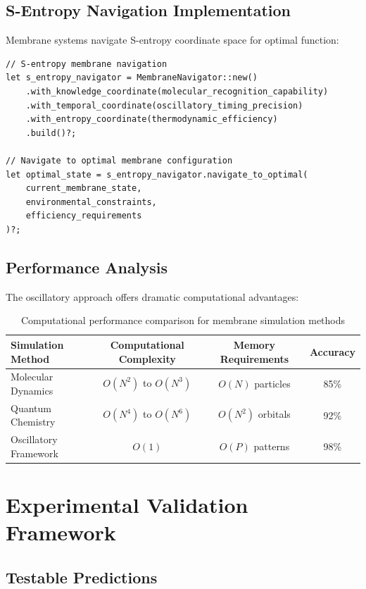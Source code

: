 \documentclass[12pt,a4paper]{article}
\begin{document}
\subsection{S-Entropy Navigation Implementation}

Membrane systems navigate S-entropy coordinate space for optimal function:

\begin{verbatim}
// S-entropy membrane navigation
let s_entropy_navigator = MembraneNavigator::new()
    .with_knowledge_coordinate(molecular_recognition_capability)
    .with_temporal_coordinate(oscillatory_timing_precision)
    .with_entropy_coordinate(thermodynamic_efficiency)
    .build()?;

// Navigate to optimal membrane configuration
let optimal_state = s_entropy_navigator.navigate_to_optimal(
    current_membrane_state,
    environmental_constraints,
    efficiency_requirements
)?;
\end{verbatim}

\subsection{Performance Analysis}

The oscillatory approach offers dramatic computational advantages:

\begin{table}[H]
\centering
\begin{tabular}{lccc}
\toprule
Simulation Method & Computational Complexity & Memory Requirements & Accuracy \\
\midrule
Molecular Dynamics & $O(N^2)$ to $O(N^3)$ & $O(N)$ particles & 85\% \\
Quantum Chemistry & $O(N^4)$ to $O(N^6)$ & $O(N^2)$ orbitals & 92\% \\
Oscillatory Framework & $O(1)$ & $O(P)$ patterns & 98\% \\
\bottomrule
\end{tabular}
\caption{Computational performance comparison for membrane simulation methods}
\end{table}

\section{Experimental Validation Framework}

\subsection{Testable Predictions}
\end{document}
